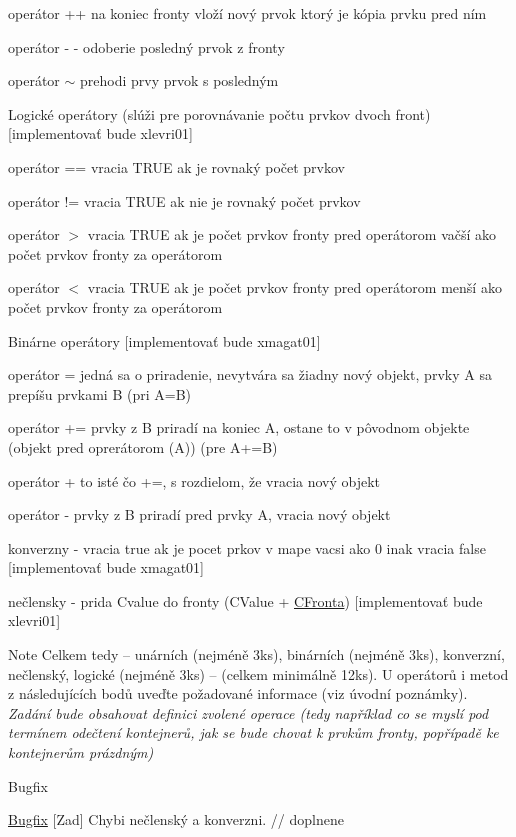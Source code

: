 \begin{DoxyEnumerate}
\begin{DoxyItemize}
\begin{DoxyItemize}
\item operátor ++ na koniec fronty vloží nový prvok ktorý je kópia prvku pred ním
\item operátor -\/ -\/ odoberie posledný prvok z fronty
\item operátor $\sim$ prehodi prvy prvok s posledným
\end{DoxyItemize}
\item Logické operátory (slúži pre porovnávanie počtu prvkov dvoch front) \mbox{[}implementovať bude xlevri01\mbox{]}
\begin{DoxyItemize}
\item operátor == vracia T\+R\+UE ak je rovnaký počet prvkov
\item operátor != vracia T\+R\+UE ak nie je rovnaký počet prvkov
\item operátor $>$ vracia T\+R\+UE ak je počet prvkov fronty pred operátorom vačší ako počet prvkov fronty za operátorom
\item operátor $<$ vracia T\+R\+UE ak je počet prvkov fronty pred operátorom menší ako počet prvkov fronty za operátorom
\end{DoxyItemize}
\item Binárne operátory \mbox{[}implementovať bude xmagat01\mbox{]}
\begin{DoxyItemize}
\item operátor = jedná sa o priradenie, nevytvára sa žiadny nový objekt, prvky A sa prepíšu prvkami B (pri A=B)
\item operátor += prvky z B priradí na koniec A, ostane to v pôvodnom objekte (objekt pred oprerátorom (A)) (pre A+=B)
\item operátor + to isté čo +=, s rozdielom, že vracia nový objekt
\item operátor -\/ prvky z B priradí pred prvky A, vracia nový objekt
\item konverzny -\/ vracia true ak je pocet prkov v mape vacsi ako 0 inak vracia false \mbox{[}implementovať bude xmagat01\mbox{]}
\item nečlensky -\/ prida Cvalue do fronty (C\+Value + \hyperlink{class_c_fronta}{C\+Fronta}) \mbox{[}implementovať bude xlevri01\mbox{]} \begin{DoxyNote}{Note}
Celkem tedy – unárních (nejméně 3ks), binárních (nejméně 3ks), konverzní, nečlenský, logické (nejméně 3ks) – (celkem minimálně 12ks). U operátorů i metod z následujících bodů uveďte požadované informace (viz úvodní poznámky). {\itshape Zadání bude obsahovat definici zvolené operace (tedy například co se myslí pod termínem odečtení kontejnerů, jak se bude chovat k prvkům fronty, popřípadě ke kontejnerům prázdným)} 
\end{DoxyNote}
\begin{DoxyRefDesc}{Bugfix}
\item[\hyperlink{bugfix__bugfix000014}{Bugfix}]\mbox{[}Zad\mbox{]} Chybi nečlenský a konverzni. // doplnene\end{DoxyRefDesc}


\end{DoxyItemize}
\end{DoxyItemize}
\end{DoxyEnumerate}

